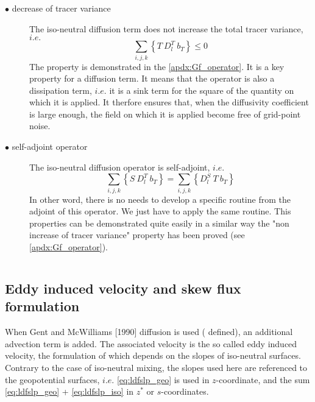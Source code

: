 \documentclass[../tex_main/NEMO_manual]{subfiles}
\begin{document}
\begin{description}
\item[$\bullet$ decrease of tracer variance]
  The iso-neutral diffusion term does not increase the total tracer variance, $i.e.$
\begin{equation} \label{eq:Gf_property1}
\sum_{i,j,k} \left\{ T \ D_l^T \ b_T \right\} \leq 0
\end{equation}
The property is demonstrated in the \autoref{apdx:Gf_operator}.
It is a key property for a diffusion term.
It means that the operator is also a dissipation term,
$i.e.$ it is a sink term for the square of the quantity on which it is applied.
It therfore ensures that, when the diffusivity coefficient is large enough,
the field on which it is applied become free of grid-point noise.

\item[$\bullet$ self-adjoint operator]
  The iso-neutral diffusion operator is self-adjoint, $i.e.$
\begin{equation} \label{eq:Gf_property1}
\sum_{i,j,k} \left\{ S \ D_l^T \ b_T \right\} = \sum_{i,j,k} \left\{ D_l^S \ T \ b_T \right\} 
\end{equation}
In other word, there is no needs to develop a specific routine from the adjoint of this operator.
We just have to apply the same routine.
This properties can be demonstrated quite easily in a similar way the "non increase of tracer variance" property
has been proved (see \autoref{apdx:Gf_operator}).
\end{description}


$\ $\newline      %
\subsection{Eddy induced velocity and skew flux formulation}

When Gent and McWilliams [1990] diffusion is used ( defined),
an additional advection term is added.
The associated velocity is the so called eddy induced velocity,
the formulation of which depends on the slopes of iso-neutral surfaces.
Contrary to the case of iso-neutral mixing, the slopes used here are referenced to the geopotential surfaces,
$i.e.$ \autoref{eq:ldfslp_geo} is used in $z$-coordinate,
and the sum \autoref{eq:ldfslp_geo} + \autoref{eq:ldfslp_iso} in $z^*$ or $s$-coordinates. 
\end{document}
